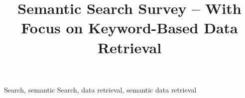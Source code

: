 \documentclass{elsart3p}    %
\begin{document}
\begin{frontmatter}

\title{Semantic Search Survey -- With Focus on Keyword-Based Data Retrieval}




\medskip



\begin{abstract}
\end{abstract}


\begin{keyword}
Search, semantic Search, data retrieval, semantic data retrieval
\end{keyword}
\end{frontmatter}












\clearpage
\end{document}
